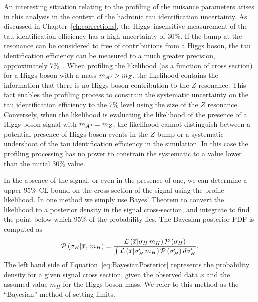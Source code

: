 An interesting situation relating to the profiling of the nuisance parameters
arises in this analysis in the context of the hadronic tau identification
uncertainty.  As discussed in Chapter~\ref{ch:corrections}, the
Higgs--insensitive measurement of the tau identification efficiency has a high
uncertainty of 30\%.  If the bump at the \ZTT resonance can be considered to
free of contributions from a Higgs boson, the tau identification efficiency can be measured to a much greater
precision, approximately 7\%~\cite{CMS-PAS-EWK-10-013, CMS-PAS-TAU-11-001}.
When profiling the likelihood (as a function of cross section) for a Higgs boson with
a mass $m_{A^0} > m_Z$, the likelihood contains the information that there is no
Higgs boson
contribution to the $Z$ resonance.  This fact enables the profiling
process to constrain the systematic uncertainty on the tau identification
efficiency to the 7\% level using the size of the $Z$ resonance.  Conversely,
when the likelihood is evaluating the likelihood of the presence of a Higgs
boson
signal with $m_{A^0} = m_Z$, the likelihood cannot distinguish between a potential
presence of Higgs boson events in the $Z$ bump or a systematic undershoot of the tau
identification efficiency in the simulation.  In this case the profiling
processing has no power to constrain the systematic to a value lower than the
initial 30\% value.

In the absence of the signal, or even in the presence of one, we can
determine a upper $95\%$ CL bound on the cross-section of the signal using
the profile likelihood.  In one method we simply use Bayes' Theorem to
convert the likelihood to a posterior density in the signal
cross-section, and integrate to find the point below which 95\% of the
probability lies.  The Bayesian posterior PDF is computed as
\begin{equation}
  {\cal P}\left( \sigma_H \vert \overline x, \, m_H \right) = 
  \frac
  {{\cal L}\left( \overline x \vert \sigma_{H} \, m_H \right) {\cal P}\left( \sigma_H \right)}
  {\int {\cal L}\left( \overline x \vert \sigma'_H \, m_H\right) {\cal P}\left(
  \sigma'_H \right) d\sigma'_H }.
  \label{eq:BayesianPosterior}
\end{equation}
The left hand side of Equation~\ref{eq:BayesianPosterior} represents the
probability density for a given signal cross section, given the observed data
$\overline x$ and the assumed value $m_H$ for the Higgs boson mass.  We refer to this
method as the ``Bayesian'' method of setting limits.
%

